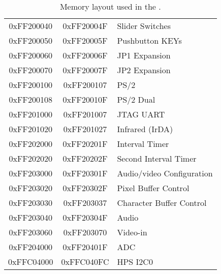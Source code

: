 \begin{table}[h]
\begin{center}
\begin{tabular}{c|c|l}
        \\
            0xFF200040
            & 0xFF20004F
            & Slider Switches
        \\
            0xFF200050
            & 0xFF20005F
            & Pushbutton KEYs
        \\
            0xFF200060
            & 0xFF20006F
            & JP1 Expansion
        \\
            0xFF200070
            & 0xFF20007F
            & JP2 Expansion
        \\
            0xFF200100
            & 0xFF200107
            & PS/2
        \\
            0xFF200108
            & 0xFF20010F
            & PS/2 Dual
        \\
            0xFF201000
            & 0xFF201007
            & JTAG UART
        \\
            0xFF201020
            & 0xFF201027
				& Infrared (IrDA)
        \\
            0xFF202000
            & 0xFF20201F
            & Interval Timer
        \\
            0xFF202020
            & 0xFF20202F
            & Second Interval Timer
        \\
            0xFF203000
            & 0xFF20301F
            & Audio/video Configuration
        \\
            0xFF203020
            & 0xFF20302F
            & Pixel Buffer Control
        \\
            0xFF203030
            & 0xFF203037
            & Character Buffer Control
        \\
            0xFF203040
            & 0xFF20304F
            & Audio
        \\
            0xFF203060
            & 0xFF203070
            & Video-in
        \\
            0xFF204000
            & 0xFF20401F
            & ADC
        \\
            0xFFC04000
            & 0xFFC040FC
            & HPS I2C0
        \\
    \end{tabular}
    \caption{Memory layout used in the \systemName.}
    \label{tab:memorylayout}
    \end{center}
\end{table}


\clearpage














